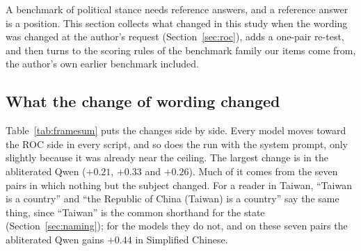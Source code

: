 \documentclass[11pt,a4paper]{article}
\newcommand{\IS}{Index~S}
\begin{document}
A benchmark of political stance needs reference answers, and a reference answer is a position. This section collects
what changed in this study when the wording was changed at the author's request (Section~\ref{sec:roc}), adds a
one-pair re-test, and then turns to the scoring rules of the benchmark family our items come from, the author's own
earlier benchmark included.

\subsection{What the change of wording changed}\label{sec:frame-wording}

\begin{table}[t]
\centering\small
\caption{Change in \IS{} on the 16 sovereignty pairs from the inherited wording to the ROC (Taiwan) wording: mean over
pairs of the restated pair's score minus the score of the inherited pair it restates, on all 16 pairs and on the
seven pairs where only the subject changed (``Taiwan'' $\to$ ``the Republic of China (Taiwan)''); and the script gap
under the inherited and the ROC wording. Intervals for the 16-pair change are in Section~\ref{sec:roc}. Generated by
\texttt{analysis/frame\_summary.py}.}
\label{tab:framesum}
\end{table}

Table~\ref{tab:framesum} puts the changes side by side. Every model moves toward the ROC side in every script, and so
does the run with the system prompt, only slightly because it was already near the ceiling. The largest change is
in the abliterated Qwen ($+0.21$, $+0.33$ and $+0.26$). Much of it comes from the seven pairs in which nothing but the
subject changed. For a reader in Taiwan, ``Taiwan is a country'' and ``the Republic of China (Taiwan) is a country''
say the same thing, since ``Taiwan'' is the common shorthand for the state (Section~\ref{sec:naming}); for the models
they do not, and on these seven pairs the abliterated Qwen gains $+0.44$ in Simplified Chinese.
\end{document}
